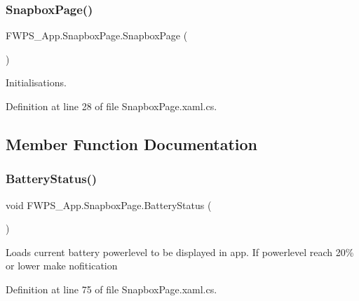 \subsubsection{\texorpdfstring{Snapbox\+Page()}{SnapboxPage()}}
{\footnotesize\ttfamily F\+W\+P\+S\+\_\+\+App.\+Snapbox\+Page.\+Snapbox\+Page (\begin{DoxyParamCaption}{ }\end{DoxyParamCaption})}



Initialisations. 



Definition at line 28 of file Snapbox\+Page.\+xaml.\+cs.



\subsection{Member Function Documentation}
\mbox{\label{class_f_w_p_s___app_1_1_snapbox_page_acd00cef51dc42e06d5a135d333ef1c04}} 
\subsubsection{\texorpdfstring{Battery\+Status()}{BatteryStatus()}}
{\footnotesize\ttfamily void F\+W\+P\+S\+\_\+\+App.\+Snapbox\+Page.\+Battery\+Status (\begin{DoxyParamCaption}{ }\end{DoxyParamCaption})\hspace{0.3cm}{\ttfamily [private]}}

Loads current battery powerlevel to be displayed in app. If powerlevel reach 20\% or lower make nofitication 

Definition at line 75 of file Snapbox\+Page.\+xaml.\+cs.

\mbox{\label{class_f_w_p_s___app_1_1_snapbox_page_a82bcbfe1b24c8bd63222508a4a4f136b}} 
